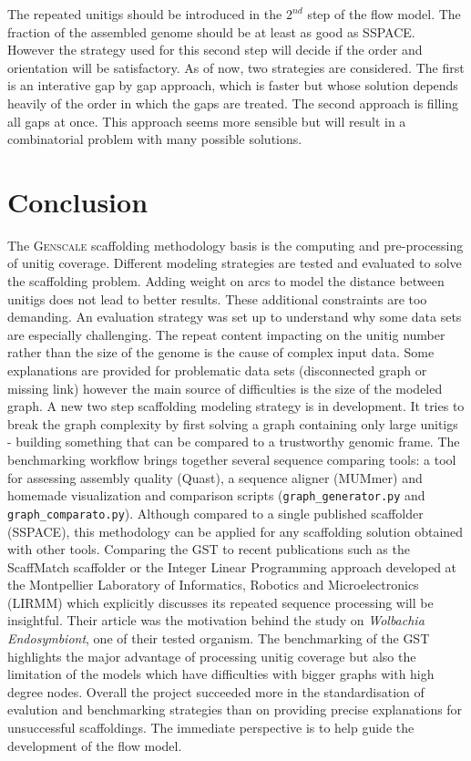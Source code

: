 \documentclass[12pt]{article}
\begin{document}
The repeated unitigs should be introduced in the $2^{nd}$ step of the flow model. The fraction of the assembled genome should be at least as good as SSPACE. However the strategy used for this second step will decide if the order and orientation will be satisfactory. As of now, two strategies are considered. The first is an interative gap by gap approach, which is faster but whose solution depends heavily of the order in which the gaps are treated. The second approach is filling all gaps at once. This approach seems more sensible but will result in a combinatorial problem with many possible solutions. 

\clearpage
\section{Conclusion} \label{sec:conc}
The \textsc{Genscale} scaffolding methodology basis is the computing and pre-processing of unitig coverage. Different modeling strategies are tested and evaluated to solve the scaffolding problem. Adding weight on arcs to model the distance between unitigs does not lead to better results. These additional constraints are too demanding. An evaluation strategy was set up to understand why some data sets are especially challenging. The repeat content impacting on the unitig number rather than the size of the genome is the cause of complex input data. Some explanations are provided for problematic data sets (disconnected graph or missing link) however the main source of difficulties is the size of the modeled graph. A new two step scaffolding modeling strategy is in development. It tries to break the graph complexity by first solving a graph containing only large unitigs - building something that can be compared to a trustworthy genomic frame. The benchmarking workflow brings together several sequence comparing tools: a tool for assessing assembly quality (Quast), a sequence aligner (MUMmer) and homemade visualization and comparison scripts (\texttt{graph\_generator.py} and \texttt{graph\_comparato.py}). Although compared to a single published scaffolder (SSPACE), this methodology can be applied for any scaffolding solution obtained with other tools. Comparing the GST to recent publications such as the ScaffMatch scaffolder or the Integer Linear Programming approach developed at the Montpellier Laboratory of Informatics, Robotics and Microelectronics (LIRMM) which explicitly discusses its repeated sequence processing will be insightful. Their article was the motivation behind the study on \textit{Wolbachia Endosymbiont}, one of their tested organism. The benchmarking of the GST highlights the major advantage of processing unitig coverage but also the limitation of the models which have difficulties with bigger graphs with high degree nodes. Overall the project succeeded more in the standardisation of evalution and benchmarking strategies than on providing precise explanations for unsuccessful scaffoldings. The immediate perspective is to help guide the development of the flow model.
\end{document}
